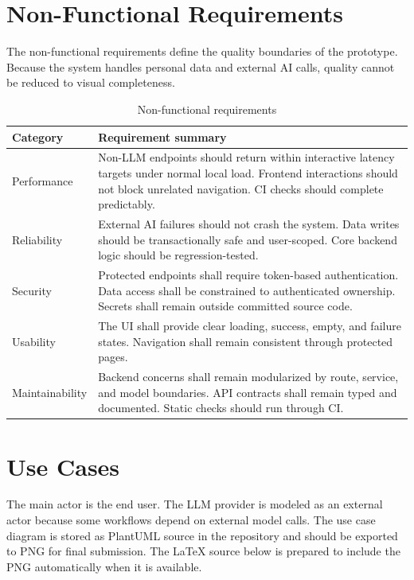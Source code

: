 \section{Non-Functional Requirements}

The non-functional requirements define the quality boundaries of the prototype. Because the system handles personal data and external AI calls, quality cannot be reduced to visual completeness.

\begin{longtable}{|p{}|p{}|}
\caption{Non-functional requirements}
\label{tab:nfr}\\
\hline
\textbf{Category} & \textbf{Requirement summary}\\
\hline
Performance & Non-LLM endpoints should return within interactive latency targets under normal local load. Frontend interactions should not block unrelated navigation. CI checks should complete predictably.\\
\hline
Reliability & External AI failures should not crash the system. Data writes should be transactionally safe and user-scoped. Core backend logic should be regression-tested.\\
\hline
Security & Protected endpoints shall require token-based authentication. Data access shall be constrained to authenticated ownership. Secrets shall remain outside committed source code.\\
\hline
Usability & The UI shall provide clear loading, success, empty, and failure states. Navigation shall remain consistent through protected pages.\\
\hline
Maintainability & Backend concerns shall remain modularized by route, service, and model boundaries. API contracts shall remain typed and documented. Static checks should run through CI.\\
\hline
\end{longtable}

\section{Use Cases}

The main actor is the end user. The LLM provider is modeled as an external actor because some workflows depend on external model calls. The use case diagram is stored as PlantUML source in the repository and should be exported to PNG for final submission. The LaTeX source below is prepared to include the PNG automatically when it is available.

